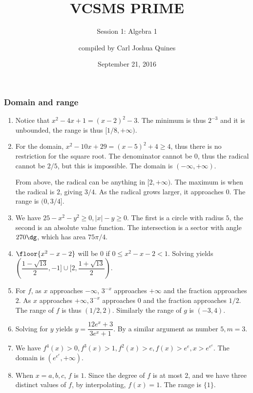 \documentclass[10pt,paper=letter]{scrartcl}
\begin{document}
\title{VCSMS PRIME}
\subtitle{Session 1: Algebra 1}
\author{compiled by Carl Joshua Quines}
\date{September 21, 2016}

\maketitle

\subsubsection*{Domain and range}

\begin{enumerate}

\item Notice that $x^2 - 4x + 1 = (x - 2)^2 - 3$. The minimum is thus $2^{-3}$ and it is unbounded, the range is thus $[1/8, +\infty)$.

\item For the domain, $x^2 - 10x + 29 = (x - 5)^2 + 4 \geq 4$, thus there is no restriction for the square root. The denominator cannot be $0$, thus the radical cannot be $2/5$, but this is impossible. The domain is $(-\infty, +\infty)$.

From above, the radical can be anything in $[2, +\infty)$. The maximum is when the radical is $2$, giving $3/4$. As the radical grows larger, it approaches $0$. The range is $(0, 3/4]$.

\item We have $25 - x^2 - y^2 \geq 0, |x| - y \geq 0$. The first is a circle with radius $5$, the second is an absolute value function. The intersection is a sector with angle $270\dg$, which has area $75\pi/4$.

\item $\floor{x^2 - x - 2}$ will be $0$ if $0 \leq x^2 - x - 2 < 1$. Solving yields $(\dfrac{1-\sqrt{13}}{2}, -1] \cup [2, \dfrac{1+\sqrt{13}}{2})$.

\item For $f$, as $x$ approaches $-\infty$, $3^{-x}$ approaches $+\infty$ and the fraction approaches $2$. As $x$ approaches $+\infty, 3^{-x}$ approaches $0$ and the fraction approaches $1/2$. The range of $f$ is thus $(1/2, 2)$. Similarly the range of $g$ is $(-3, 4)$.

\item Solving for $y$ yields $y = \dfrac{12e^x + 3}{3e^x + 1}$. By a similar argument as number $5, m = 3$. 

\item We have $f^4(x) > 0, f^3(x) > 1, f^2(x) > e, f(x) > e^e, x > e^{e^e}$. The domain is $(e^{e^e}, +\infty)$.

\item When $x = a, b, c$, $f$ is $1$. Since the degree of $f$ is at most $2$, and we have three distinct values of $f$, by interpolating, $f(x) = 1$. The range is $\{1\}$.

\end{enumerate}
\end{document}
